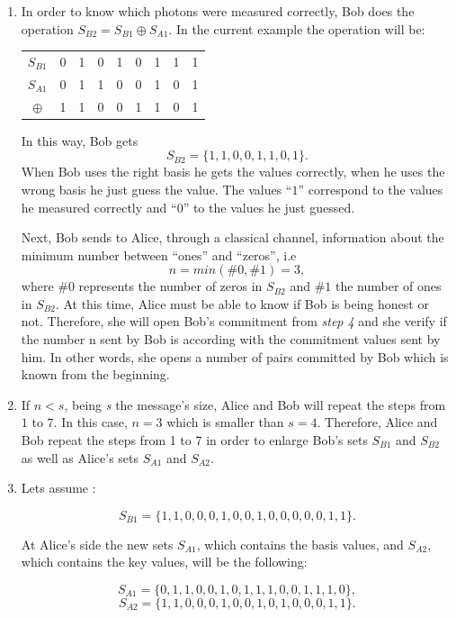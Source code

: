 \begin{enumerate}
  \item In order to know which photons were measured correctly, Bob does the operation $S_{B2}=S_{B1} \oplus S_{A1}$.
      In the current example the operation will be:

  \begin{table}[H]
    \centering
    \begin{tabular}{c|c c c c c c c c}
     $S_{B1}$ & 0 & 1 & 0 & 1 & 0 & 1 & 1 & 1 \\
     $S_{A1}$ & 0 & 1 & 1 & 0 & 0 & 1 & 0 & 1 \\ \hline
     $\oplus$ & 1 & 1 & 0 & 0 & 1 & 1 & 0 & 1
    \end{tabular}
    \end{table}

      In this way, Bob gets $$S_{B2} = \{1,1,0,0,1,1,0,1 \}.$$ When Bob uses the right basis he gets the values correctly, when he uses the wrong basis he just guess the value. The values ``$1$'' correspond to the values he measured correctly and ``$0$'' to the values he just guessed.

       Next, Bob sends to Alice, through a classical channel, information about the minimum number between ``ones'' and ``zeros'', i.e $$n=min(\#0,\#1)=3,$$ where $\#0$ represents the number of zeros in $S_{B2}$ and $\#1$ the number of ones in $S_{B2}$. At this time, Alice must be able to know if Bob is being honest or not. Therefore, she will open Bob's commitment from \textit{step 4} and she verify if the number n sent by Bob is according with the commitment values sent by him. In other words, she opens a number of pairs committed by Bob which is known from the beginning. 

  \item If $n<s$, being \textit{s} the message's size, Alice and Bob will repeat the steps from $1$ to $7$. In this case, $n=3$ which is smaller than $s=4$. Therefore, Alice and Bob repeat the steps from 1 to 7 in order to enlarge Bob's sets $S_{B1}$ and $S_{B2}$ as well as Alice's sets $S_{A1}$ and $S_{A2}$.

  \item Lets assume :

   $$S_{B1}= \{1,1,0,0,0,1,0,0,1,0,0,0,0,0,1,1 \}.$$

    At Alice's side the new sets $S_{A1}$, which contains the basis values, and $S_{A2}$, which contains the key values, will be the following:

    $$S_{A1}=\{0,1,1,0,0,1,0,1,1,1,0,0,1,1,1,0 \},$$ $$S_{A2}=\{1,1,0,0,0,1,0,0,1,0,1,0,0,0,1,1 \}.$$


\end{enumerate}
